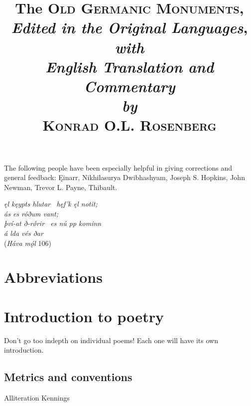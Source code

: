 \title{%
  \Huge The \textsc{Old Germanic Monuments}, \\
  \huge\emph{Edited in the Original Languages}, \\
  \large\emph{with} \\
  \huge\emph{English Translation and Commentary} \\
  \large\emph{by} \\
  \Huge \textsc{Konrad O.L. Rosenberg}
}

\maketitle

\newpage\thispagestyle{empty}

\begin{center} The following people have been especially helpful in giving corrections and general feedback: Ęinarr, Nikhilasurya Dwibhashyam, Joseph S. Hopkins, John Newman, Trevor L. Payne, Thibault.\end{center}

\begin{center} \emph{ęl kęypts hlutar \hld\ hęf’k ęl notit; \\
ás es róðum vant; \\
því-at ð-rǿrir \hld\ es nú pp kominn \\
á lda vés ðar} \\
(\emph{Háva mǫ́l} 106)\end{center}

\newpage\thispagestyle{empty}

\tableofcontents

\newpage

\thispagestyle{empty}\section{Abbreviations}
  
\newpage


\section{Introduction to poetry}
  Don't go too indepth on individual poems! Each one will have its own introduction.
  \subsection{Metrics and conventions}
    Alliteration
    Kennings
